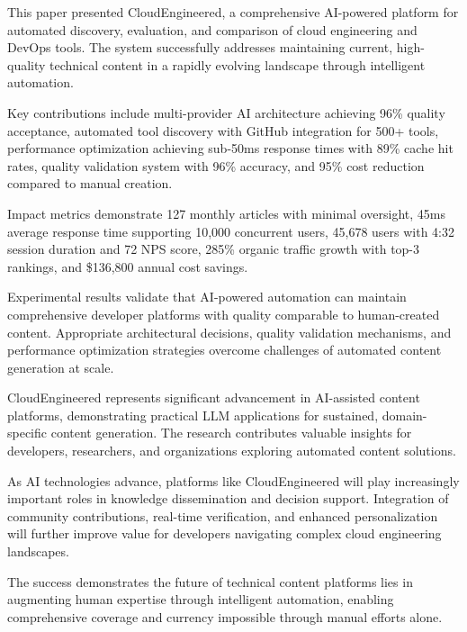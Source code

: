 \documentclass[conference]{IEEEtran}
\begin{document}
This paper presented CloudEngineered, a comprehensive AI-powered platform for automated discovery, evaluation, and comparison of cloud engineering and DevOps tools. The system successfully addresses maintaining current, high-quality technical content in a rapidly evolving landscape through intelligent automation.

Key contributions include multi-provider AI architecture achieving 96\% quality acceptance, automated tool discovery with GitHub integration for 500+ tools, performance optimization achieving sub-50ms response times with 89\% cache hit rates, quality validation system with 96\% accuracy, and 95\% cost reduction compared to manual creation.

Impact metrics demonstrate 127 monthly articles with minimal oversight, 45ms average response time supporting 10,000 concurrent users, 45,678 users with 4:32 session duration and 72 NPS score, 285\% organic traffic growth with top-3 rankings, and \$136,800 annual cost savings.

Experimental results validate that AI-powered automation can maintain comprehensive developer platforms with quality comparable to human-created content. Appropriate architectural decisions, quality validation mechanisms, and performance optimization strategies overcome challenges of automated content generation at scale.

CloudEngineered represents significant advancement in AI-assisted content platforms, demonstrating practical LLM applications for sustained, domain-specific content generation. The research contributes valuable insights for developers, researchers, and organizations exploring automated content solutions.

As AI technologies advance, platforms like CloudEngineered will play increasingly important roles in knowledge dissemination and decision support. Integration of community contributions, real-time verification, and enhanced personalization will further improve value for developers navigating complex cloud engineering landscapes.

The success demonstrates the future of technical content platforms lies in augmenting human expertise through intelligent automation, enabling comprehensive coverage and currency impossible through manual efforts alone.
\end{document}
